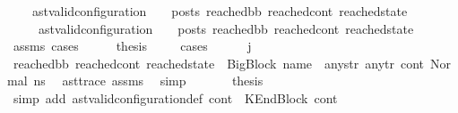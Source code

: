 \begin{isabellebody}
\ \ \ \ {\isacharparenleft}{\kern0pt}ast{\isacharunderscore}{\kern0pt}valid{\isacharunderscore}{\kern0pt}configuration\ {\isasymLambda}\ {\isasymGamma}\ {\isasymOmega}\ posts\ reached{\isacharunderscore}{\kern0pt}bb\ reached{\isacharunderscore}{\kern0pt}cont\ reached{\isacharunderscore}{\kern0pt}state{\isacharparenright}{\kern0pt}{\isachardoublequoteclose}\isanewline
\ \ \ \ \ {\isachardoublequoteopen}{\isacharparenleft}{\kern0pt}ast{\isacharunderscore}{\kern0pt}valid{\isacharunderscore}{\kern0pt}configuration\ {\isasymLambda}\ {\isasymGamma}\ {\isasymOmega}\ posts\ reached{\isacharunderscore}{\kern0pt}bb\ reached{\isacharunderscore}{\kern0pt}cont\ reached{\isacharunderscore}{\kern0pt}state{\isacharparenright}{\kern0pt}{\isachardoublequoteclose}\ \isanewline
%
\isadelimproof
\ \ %
\endisadelimproof
%
\isatagproof
{}\isamarkupfalse%
\ assms\ cases\isanewline
{}\isamarkupfalse%
\ {\isacharminus}{\kern0pt}\isanewline
\ \ \isamarkupfalse%
\ {\isacharquery}{\kern0pt}thesis\ \isanewline
\ \ \isamarkupfalse%
\ cases\isanewline
\ \ \ \ \isamarkupfalse%
\ {\isachardoublequoteopen}j\ {\isacharequal}{\kern0pt}\ {}{\isachardoublequoteclose}\isanewline
\ \ \ \ \isamarkupfalse%
\ {\isachardoublequoteopen}{\isacharparenleft}{\kern0pt}reached{\isacharunderscore}{\kern0pt}bb{\isacharcomma}{\kern0pt}\ reached{\isacharunderscore}{\kern0pt}cont{\isacharcomma}{\kern0pt}\ reached{\isacharunderscore}{\kern0pt}state{\isacharparenright}{\kern0pt}\ {\isacharequal}{\kern0pt}\ {\isacharparenleft}{\kern0pt}{\isacharparenleft}{\kern0pt}BigBlock\ name\ {\isacharbrackleft}{\kern0pt}{\isacharbrackright}{\kern0pt}\ any{\isacharunderscore}{\kern0pt}str\ any{\isacharunderscore}{\kern0pt}tr{\isacharparenright}{\kern0pt}{\isacharcomma}{\kern0pt}\ cont{}{\isacharcomma}{\kern0pt}\ {\isacharparenleft}{\kern0pt}Normal\ ns{}{\isacharparenright}{\kern0pt}{\isacharparenright}{\kern0pt}{\isachardoublequoteclose}\ \isamarkupfalse%
\ ast{\isacharunderscore}{\kern0pt}trace\ assms{\isacharparenleft}{\kern0pt}{}{\isacharparenright}{\kern0pt}\ \isamarkupfalse%
\ simp\ \isanewline
\ \ \ \ \isamarkupfalse%
\ {\isacharquery}{\kern0pt}thesis\ \isamarkupfalse%
\ {\isacharparenleft}{\kern0pt}simp\ add{\isacharcolon}{\kern0pt}\ ast{\isacharunderscore}{\kern0pt}valid{\isacharunderscore}{\kern0pt}configuration{\isacharunderscore}{\kern0pt}def\ {\isacartoucheopen}cont{}\ {\isacharequal}{\kern0pt}\ KEndBlock\ cont{}{\isacartoucheclose}{\isacharparenright}{\kern0pt}\isanewline

\end{isabellebody}

